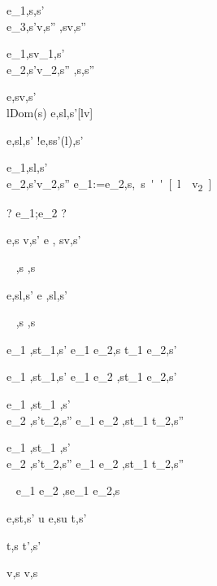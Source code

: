   {e_1,s\evaluate \False,s'\\
   e_3,s'\evaluate v,s''}
  {,s\evaluate v,s''}


  {e_1,s\evaluate v_1,s'\\
   e_2,s'\evaluate v_2,s''}
  {,s\evaluate{},s''}


  {e,s\evaluate v,s'\\
   l\not\in Dom(s)}
  {\Ref e,s\evaluate l,s'[l\mapsto v]}

  {e,s\evaluate l,s'}
  {!e,s\evaluate s'(l),s'}

  {e_1,s\evaluate l,s'\\
   e_2,s'\evaluate v_2,s''}
  {e_1:=e_2,s\evaluate \unit,s''[l\mapsto v_2]}


  {?}
  {e_1;e_2 \evaluate ?}

  {e,s \evaluate v,s'}
  {\Edit e , s\evaluate \Edit v,s'}

  {\ }
  {\Enter \tau,s \evaluate \Enter \tau,s}

  {e,s\evaluate l,s'}
  {\Update e ,s\evaluate \Update l,s'}


  {\ }
  {\Fail,s \evaluate \Fail,s}


  {e_1 ,s\evaluate t_1,s'}
  {e_1 \Then e_2,s \evaluate t_1 \Then e_2,s'}

  {e_1 ,s\evaluate t_1,s'}
  {e_1 \Next e_2 ,s\evaluate t_1 \Next e_2,s'}


  {e_1 ,s\evaluate t_1 ,s'\\
   e_2 ,s'\evaluate t_2,s''}
  {e_1 \And e_2 ,s\evaluate t_1 \And t_2,s''}


  {e_1 ,s\evaluate t_1 ,s'\\
   e_2 ,s'\evaluate t_2,s''}
  {e_1 \Or e_2 ,s\evaluate t_1 \Or t_2,s''}

  {\ }
  {e_1 \Xor e_2 ,s\evaluate e_1 \Xor e_2,s}


    {e,s\evaluate t,s'}
    {u \At e,s\evaluate u \At t,s'}





  {t,s \normalise t',s'}


  { }
  {\Edit v,s \normalise \Edit v,s}

